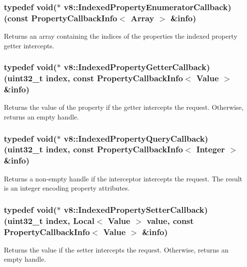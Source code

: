 \subsubsection[{Indexed\+Property\+Enumerator\+Callback}]{\setlength{\rightskip}{0pt plus 5cm}typedef void($\ast$ v8\+::\+Indexed\+Property\+Enumerator\+Callback) (const {\bf Property\+Callback\+Info}$<$ {\bf Array} $>$ \&info)}\label{namespacev8_adbb0a6d5537371953f9ba807d4f6275e}
Returns an array containing the indices of the properties the indexed property getter intercepts. \hypertarget{namespacev8_a48e7816ba64447bf32a25d194588daaf}{}
\subsubsection[{Indexed\+Property\+Getter\+Callback}]{\setlength{\rightskip}{0pt plus 5cm}typedef void($\ast$ v8\+::\+Indexed\+Property\+Getter\+Callback) (uint32\+\_\+t index, const {\bf Property\+Callback\+Info}$<$ {\bf Value} $>$ \&info)}\label{namespacev8_a48e7816ba64447bf32a25d194588daaf}
Returns the value of the property if the getter intercepts the request. Otherwise, returns an empty handle. \hypertarget{namespacev8_a980b62c33eb664783e61e25c3b27f9ee}{}
\subsubsection[{Indexed\+Property\+Query\+Callback}]{\setlength{\rightskip}{0pt plus 5cm}typedef void($\ast$ v8\+::\+Indexed\+Property\+Query\+Callback) (uint32\+\_\+t index, const {\bf Property\+Callback\+Info}$<$ {\bf Integer} $>$ \&info)}\label{namespacev8_a980b62c33eb664783e61e25c3b27f9ee}
Returns a non-\/empty handle if the interceptor intercepts the request. The result is an integer encoding property attributes. \hypertarget{namespacev8_a4ac7cc6185ebc8b6a199f9fa8e6bf5c3}{}
\subsubsection[{Indexed\+Property\+Setter\+Callback}]{\setlength{\rightskip}{0pt plus 5cm}typedef void($\ast$ v8\+::\+Indexed\+Property\+Setter\+Callback) (uint32\+\_\+t index, {\bf Local}$<$ {\bf Value} $>$ value, const {\bf Property\+Callback\+Info}$<$ {\bf Value} $>$ \&info)}\label{namespacev8_a4ac7cc6185ebc8b6a199f9fa8e6bf5c3}
Returns the value if the setter intercepts the request. Otherwise, returns an empty handle. \hypertarget{namespacev8_aebbcc7837753e51112d944ad96520da1}{}
